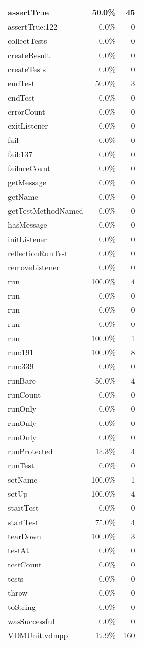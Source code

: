 \documentclass[a4paper]{article}
\begin{document}
\begin{longtable}{|l|r|r|}
\hline
assertTrue & 50.0\% & 45 \\
\hline
assertTrue:122 & 0.0\% & 0 \\
\hline
collectTests & 0.0\% & 0 \\
\hline
createResult & 0.0\% & 0 \\
\hline
createTests & 0.0\% & 0 \\
\hline
endTest & 50.0\% & 3 \\
\hline
endTest & 0.0\% & 0 \\
\hline
errorCount & 0.0\% & 0 \\
\hline
exitListener & 0.0\% & 0 \\
\hline
fail & 0.0\% & 0 \\
\hline
fail:137 & 0.0\% & 0 \\
\hline
failureCount & 0.0\% & 0 \\
\hline
getMessage & 0.0\% & 0 \\
\hline
getName & 0.0\% & 0 \\
\hline
getTestMethodNamed & 0.0\% & 0 \\
\hline
hasMessage & 0.0\% & 0 \\
\hline
initListener & 0.0\% & 0 \\
\hline
reflectionRunTest & 0.0\% & 0 \\
\hline
removeListener & 0.0\% & 0 \\
\hline
run & 100.0\% & 4 \\
\hline
run & 0.0\% & 0 \\
\hline
run & 0.0\% & 0 \\
\hline
run & 0.0\% & 0 \\
\hline
run & 100.0\% & 1 \\
\hline
run:191 & 100.0\% & 8 \\
\hline
run:339 & 0.0\% & 0 \\
\hline
runBare & 50.0\% & 4 \\
\hline
runCount & 0.0\% & 0 \\
\hline
runOnly & 0.0\% & 0 \\
\hline
runOnly & 0.0\% & 0 \\
\hline
runOnly & 0.0\% & 0 \\
\hline
runProtected & 13.3\% & 4 \\
\hline
runTest & 0.0\% & 0 \\
\hline
setName & 100.0\% & 1 \\
\hline
setUp & 100.0\% & 4 \\
\hline
startTest & 0.0\% & 0 \\
\hline
startTest & 75.0\% & 4 \\
\hline
tearDown & 100.0\% & 3 \\
\hline
testAt & 0.0\% & 0 \\
\hline
testCount & 0.0\% & 0 \\
\hline
tests & 0.0\% & 0 \\
\hline
throw & 0.0\% & 0 \\
\hline
toString & 0.0\% & 0 \\
\hline
wasSuccessful & 0.0\% & 0 \\
\hline
\hline
VDMUnit.vdmpp & 12.9\% & 160 \\
\hline
\end{longtable}
\end{document}
